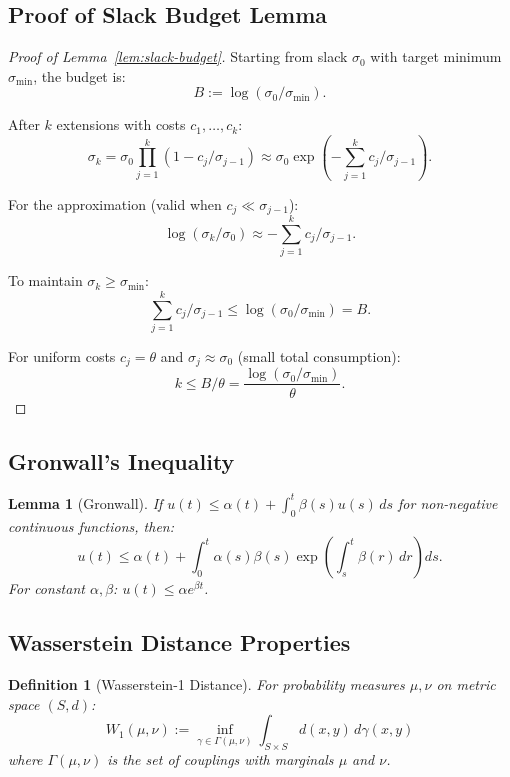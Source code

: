 \documentclass[12pt]{article}
\newtheorem{lemma}[theorem]{Lemma}
\newtheorem{definition}[theorem]{Definition}
\begin{document}
\subsection{Proof of Slack Budget Lemma}

\begin{proof}[Proof of Lemma~\ref{lem:slack-budget}]
Starting from slack $\sigma_0$ with target minimum $\sigma_{\min}$, the budget is:
\[
B := \log(\sigma_0 / \sigma_{\min}).
\]

After $k$ extensions with costs $c_1, \ldots, c_k$:
\[
\sigma_k = \sigma_0 \prod_{j=1}^k (1 - c_j / \sigma_{j-1}) \approx \sigma_0 \exp\left( -\sum_{j=1}^k c_j / \sigma_{j-1} \right).
\]

For the approximation (valid when $c_j \ll \sigma_{j-1}$):
\[
\log(\sigma_k / \sigma_0) \approx -\sum_{j=1}^k c_j / \sigma_{j-1}.
\]

To maintain $\sigma_k \geq \sigma_{\min}$:
\[
\sum_{j=1}^k c_j / \sigma_{j-1} \leq \log(\sigma_0 / \sigma_{\min}) = B.
\]

For uniform costs $c_j = \theta$ and $\sigma_j \approx \sigma_0$ (small total consumption):
\[
k \leq B / \theta = \frac{\log(\sigma_0 / \sigma_{\min})}{\theta}.
\]
\end{proof}

\subsection{Gronwall's Inequality}

\begin{lemma}[Gronwall]
\label{lem:gronwall}
If $u(t) \leq \alpha(t) + \int_0^t \beta(s) u(s) \, ds$ for non-negative continuous functions, then:
\[
u(t) \leq \alpha(t) + \int_0^t \alpha(s) \beta(s) \exp\left( \int_s^t \beta(r) \, dr \right) ds.
\]
For constant $\alpha, \beta$: $u(t) \leq \alpha e^{\beta t}$.
\end{lemma}

\subsection{Wasserstein Distance Properties}

\begin{definition}[Wasserstein-1 Distance]
For probability measures $\mu, \nu$ on metric space $(S, d)$:
\[
W_1(\mu, \nu) := \inf_{\gamma \in \Gamma(\mu, \nu)} \int_{S \times S} d(x, y) \, d\gamma(x, y)
\]
where $\Gamma(\mu, \nu)$ is the set of couplings with marginals $\mu$ and $\nu$.
\end{definition}
\end{document}
